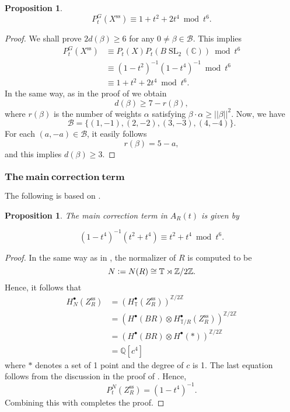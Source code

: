 \documentclass[12pt, pdftex]{amsart}
\theoremstyle{plain}
\newtheorem{prop}[thm]{Proposition}
\theoremstyle{definition}
\numberwithin{equation}{section}
\def\Q{{\mathbb Q}}
\def\Z{{\mathbb Z}}
\def\C{{\mathbb C}}
\def\SL{\mathop{\mathrm{SL}}\nolimits}
\def\ss{\mathop{\mathrm{ss}}}
\def\a{\alpha}
\newcommand{\defeq}{\vcentcolon=}
\begin{document}
\begin{prop}
\label{prop:semi-stable_locus}
\[P_t^G(X^{\ss})\equiv 1+t^2+2t^4 \bmod t^6.\]
\end{prop}
\begin{proof}
We shall prove $2d(\beta)\geq 6$ for any $0\neq\beta\in\mathcal{B}$.
This implies
\begin{align*}
    P_t^G(X^{\ss})&\equiv P_t(X)P_t(B\SL_2(\C))\bmod t^6 \\
        &\equiv (1-t^2)^{-1}(1-t^4)^{-1}\bmod t^6\\
    &\equiv 1+t^2+2t^4\bmod t^6.
\end{align*}
In the same way, as in the proof of \cite[Proposition 3.5]{CMGHL19} we obtain 
\[d(\beta)\geq7-r(\beta),\]
where $r(\beta)$ is the number of weights $\a$ satisfying $\beta\cdot\a\geq ||\beta||^2$.
Now, we have
\[\mathcal{B}=\{(1,-1), (2,-2), (3,-3), (4,-4)\}.\]
For each $(a,-a)\in\mathcal{B}$, it easily follows 
\[r(\beta)=5-a,\]
and this implies $d(\beta)\geq 3$.

\end{proof}

\subsubsection{$\mathrm{\mathbf{The\ main\ correction\ term}}$}
\label{subsection:main_correction}

The following is based on \cite[Chapter 4]{CMGHL19}.


\begin{prop}
\label{prop:main_correction}
The main correction term in $A_R(t)$ is given by 

 \[ (1-t^4)^{-1}(t^2+t^4)\equiv t^2+t^4 \bmod t^6.  \]

\end{prop}
\begin{proof}
In the same way as in \cite[Proposition B.1 (4)]{CMGHL19}, the normalizer of $R$ is computed to be
\[N\defeq N(R)\cong \mathbb{T}\rtimes \Z/2\Z.\]
Hence, it follows that
\begin{align*}
    H_N^{\bullet}(Z_R^{\ss})&=(H_{\mathbb{T}}^{\bullet}(Z_R^{\ss}))^{\Z/2\Z}\\
    &=(H^{\bullet}(BR)\otimes H^{\bullet}_{\mathbb{T}/R}(Z_R^{\ss}))^{\Z/2\Z}\\
    &=(H^{\bullet}(BR)\otimes H^{\bullet}(*))^{\Z/2\Z}\\
        &=\Q[c^4]
\end{align*}
where $*$ denotes a set of 1 point and the degree of $c$ is 1.
The last equation follows from the discussion in the proof of \cite[Proposition 4.4]{CMGHL19}.
Hence, 
\[P_t^N(Z_R^{\ss})=(1-t^4)^{-1}.\]
Combining this with \cite[(4.24)]{CMGHL19} completes the proof.
\end{proof}
\end{document}
